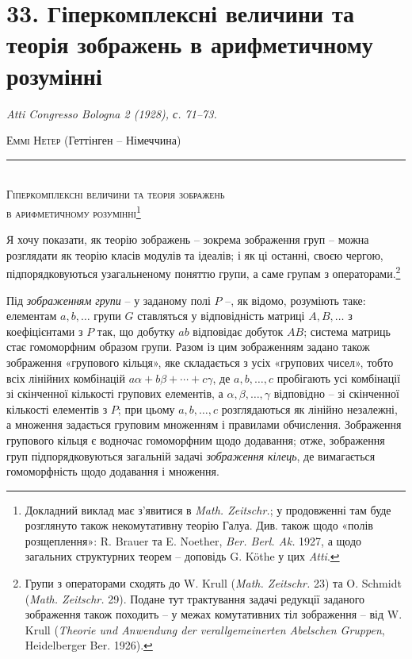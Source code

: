 \documentclass[11pt]{article}
\begin{document}
\section*{33. Гіперкомплексні величини та теорія зображень в арифметичному розумінні}
\emph{Atti Congresso Bologna 2 (1928), с. 71--73.}

\begin{center}
\textsc{Еммі Нетер} (Геттінген -- Німеччина)\\[-0.1em]
\rule{3em}{0.4pt}\\[0.8em]
\textsc{Гіперкомплексні величини та теорія зображень}\\
\textsc{в арифметичному розумінні}\footnote{Докладний виклад має з'явитися в \emph{Math. Zeitschr.}; у продовженні там буде розглянуто також некомутативну теорію Галуа. Див. також щодо «полів розщеплення»: R. Brauer та E. Noether, \emph{Ber. Berl. Ak.} 1927, а щодо загальних структурних теорем -- доповідь G. Köthe у цих \emph{Atti}.}
\end{center}

Я хочу показати, як теорію зображень -- зокрема зображення груп -- можна розглядати як теорію класів модулів та ідеалів; і як ці останні, своєю чергою, підпорядковуються узагальненому поняттю групи, а саме групам з операторами.\footnote{Групи з операторами сходять до W. Krull (\emph{Math. Zeitschr.} 23) та O. Schmidt (\emph{Math. Zeitschr.} 29). Подане тут трактування задачі редукції заданого зображення також походить -- у межах комутативних тіл зображення -- від W. Krull (\emph{Theorie und Anwendung der verallgemeinerten Abelschen Gruppen}, Heidelberger Ber. 1926).}

Під \emph{зображенням групи} -- у заданому полі $P$ --, як відомо, розуміють таке: елементам $a,b,\ldots$ групи $G$ ставляться у відповідність матриці $A,B,\ldots$ з коефіцієнтами з $P$ так, що добутку $ab$ відповідає добуток $AB$; система матриць стає гомоморфним образом групи. Разом із цим зображенням задано також зображення «групового кільця», яке складається з усіх «групових чисел», тобто всіх лінійних комбінацій $a\alpha+b\beta+\cdots+c\gamma$, де $a,b,\ldots,c$ пробігають усі комбінації зі скінченної кількості групових елементів, а $\alpha,\beta,\ldots,\gamma$ відповідно -- зі скінченної кількості елементів з $P$; при цьому $a,b,\ldots,c$ розглядаються як лінійно незалежні, а множення задається груповим множенням і правилами обчислення. Зображення групового кільця є водночас гомоморфним щодо додавання; отже, зображення груп підпорядковуються загальній задачі \emph{зображення кілець}, де вимагається гомоморфність щодо додавання і множення.
\end{document}
